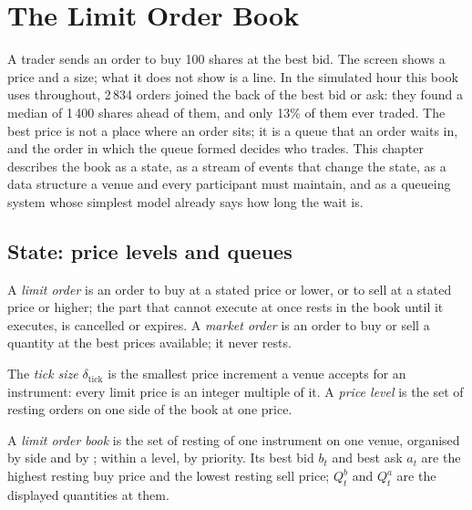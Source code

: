 \chapter{The Limit Order Book}\label{ch:mx:the-limit-order-book}

A trader sends an order to buy 100 shares at the best bid. The screen shows a price and a size; what it does not show is a line. In the
simulated hour this book uses throughout, 2\,834 orders joined the back of the best bid or ask: they found a median of 1\,400 shares ahead of
them, and only 13\% of them ever traded. The best price is not a place where an order sits; it is a queue that an order waits in, and the order
in which the queue formed decides who trades. This chapter describes the book as a state, as a stream of events that change the state, as a data
structure a venue and every participant must maintain, and as a queueing system whose simplest model already says how long the wait is.

\section{State: price levels and queues}

\begin{definition}\label{def:mx:the-limit-order-book:orders}
A \emph{limit order} is an order to buy at a stated price or lower, or to sell at a stated price or higher; the part that cannot
execute at once rests in the book until it executes, is cancelled or expires. A \emph{market order} is an order to buy or
sell a quantity at the best prices available; it never rests.
\end{definition}

\begin{definition}\label{def:mx:the-limit-order-book:tick}
The \emph{tick size} $\delta_{\mathrm{tick}}$ is the smallest price increment a venue accepts for an instrument: every limit
price is an integer multiple of it. A \emph{price level} is the set of resting orders on one side of the book at one price.
\end{definition}

\begin{definition}\label{def:mx:the-limit-order-book:lob}
A \emph{limit order book} is the set of resting  of one instrument on one venue, organised by side and by
; within a level, by priority. Its best bid $b_t$ and best ask $a_t$ are the highest resting buy price and the lowest resting sell price;
$Q^b_t$ and $Q^a_t$ are the displayed quantities at them.
\end{definition}

